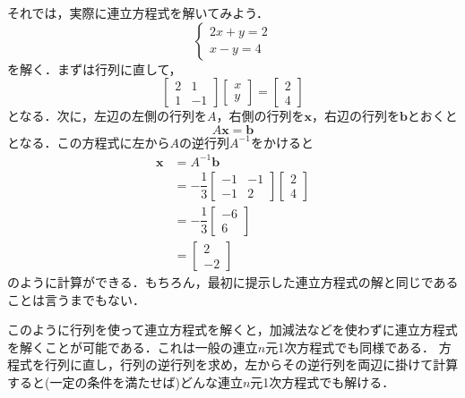 \documentclass[a4paper,12pt,autodetect-engine,dvipdfmx]{jsarticle}
\theoremstyle{definition}
\begin{document}
それでは，実際に連立方程式を解いてみよう．
\begin{equation*}
    \begin{cases}
        2x + y = 2\\
        x - y = 4
    \end{cases}
\end{equation*}
を解く．まずは行列に直して，
\begin{equation*}
    \begin{bmatrix}
        2 & 1\\
        1 & -1
    \end{bmatrix}
    \begin{bmatrix}
        x\\
        y
    \end{bmatrix}
    =
    \begin{bmatrix}
        2\\
        4
    \end{bmatrix}
\end{equation*}
となる．次に，左辺の左側の行列を$A$，右側の行列を$\bm{x}$，右辺の行列を$\bm{b}$とおくと
\begin{equation*}
    A \bm{x} = \bm{b}
\end{equation*}
となる．この方程式に左から$A$の逆行列$A^{-1}$をかけると
\begin{align*}
    \bm{x} &= 
    A^{-1} \bm{b}\\
    &=
    - \dfrac{1}{3}
    \begin{bmatrix}
        -1 & -1\\
        -1 & 2
    \end{bmatrix}
    \begin{bmatrix}
        2\\
        4
    \end{bmatrix}\\
    &=
    - \dfrac{1}{3}
    \begin{bmatrix}
        -6\\
        6
    \end{bmatrix}\\
    &=
    \begin{bmatrix}
        2\\
        -2
    \end{bmatrix}
\end{align*}
のように計算ができる．もちろん，最初に提示した連立方程式の解と同じであることは言うまでもない．

このように行列を使って連立方程式を解くと，加減法などを使わずに連立方程式を解くことが可能である．これは一般の連立$n$元1次方程式でも同様である．
方程式を行列に直し，行列の逆行列を求め，左からその逆行列を両辺に掛けて計算すると(一定の条件を満たせば)どんな連立$n$元1次方程式でも解ける．
\end{document}

